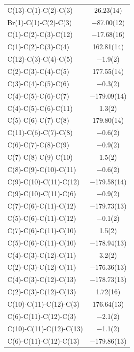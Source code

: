 \pagebreak
\begin{center}
\tablefirsthead{%
\toprule}
\tablelasttail{\bottomrule}
{\footnotesize \singlespacing
\begin{supertabular}{p{1.5in}c}
C(13)-C(1)-C(2)-C(3)&26.23(14)\\
Br(1)-C(1)-C(2)-C(3)&$-$87.00(12)\\
C(1)-C(2)-C(3)-C(12)&$-$17.68(16)\\
C(1)-C(2)-C(3)-C(4)&162.81(14)\\
C(12)-C(3)-C(4)-C(5)&$-$1.9(2)\\
C(2)-C(3)-C(4)-C(5)&177.55(14)\\
C(3)-C(4)-C(5)-C(6)&$-$0.3(2)\\
C(4)-C(5)-C(6)-C(7)&$-$179.09(14)\\
C(4)-C(5)-C(6)-C(11)&1.3(2)\\
C(5)-C(6)-C(7)-C(8)&179.80(14)\\
C(11)-C(6)-C(7)-C(8)&$-$0.6(2)\\
C(6)-C(7)-C(8)-C(9)&$-$0.9(2)\\
C(7)-C(8)-C(9)-C(10)&1.5(2)\\
C(8)-C(9)-C(10)-C(11)&$-$0.6(2)\\
C(9)-C(10)-C(11)-C(12)&$-$179.58(14)\\
C(9)-C(10)-C(11)-C(6)&$-$0.9(2)\\
C(7)-C(6)-C(11)-C(12)&$-$179.73(13)\\
C(5)-C(6)-C(11)-C(12)&$-$0.1(2)\\
C(7)-C(6)-C(11)-C(10)&1.5(2)\\
C(5)-C(6)-C(11)-C(10)&$-$178.94(13)\\
C(4)-C(3)-C(12)-C(11)&3.2(2)\\
C(2)-C(3)-C(12)-C(11)&$-$176.36(13)\\
C(4)-C(3)-C(12)-C(13)&$-$178.73(13)\\
C(2)-C(3)-C(12)-C(13)&1.72(16)\\
C(10)-C(11)-C(12)-C(3)&176.64(13)\\
C(6)-C(11)-C(12)-C(3)&$-$2.1(2)\\
C(10)-C(11)-C(12)-C(13)&$-$1.1(2)\\
C(6)-C(11)-C(12)-C(13)&$-$179.86(13)\\

\end{supertabular}}
\end{center}
